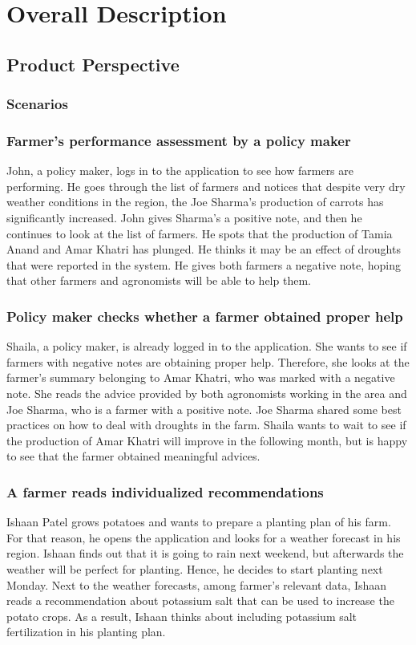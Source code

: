 \chapter{Overall Description}

\section{Product Perspective}
\subsection{Scenarios}
\subsection*{Farmer's performance assessment by a policy maker}
John, a policy maker, logs in to the application to see how farmers are performing. He goes through the list of farmers and notices that despite very dry weather conditions in the region, the Joe Sharma's production of carrots has significantly increased. John gives Sharma's a positive note, and then he continues to look at the list of farmers. He spots that the production of Tamia Anand and Amar Khatri has plunged. He thinks it may be an effect of droughts that were reported in the system. He gives both farmers a negative note, hoping that other farmers and agronomists will be able to help them. 

\subsection*{Policy maker checks whether a farmer obtained proper help}
Shaila, a policy maker, is already logged in to the application. She wants to see if farmers with negative notes are obtaining proper help. Therefore, she looks at the farmer's summary belonging to Amar Khatri, who was marked with a negative note. She reads the advice provided by both agronomists working in the area and Joe Sharma, who is a farmer with a positive note. Joe Sharma shared some best practices on how to deal with droughts in the farm. Shaila wants to wait to see if the production of Amar Khatri will improve in the following month, but is happy to see that the farmer obtained meaningful advices.

\subsection*{A farmer reads individualized recommendations}
Ishaan Patel grows potatoes and wants to prepare a planting plan of his farm. For that reason, he opens the application and looks for a weather forecast in his region. Ishaan finds out that it is going to rain next weekend, but afterwards the weather will be perfect for planting. Hence, he decides to start planting next Monday. Next to the weather forecasts, among farmer's relevant data, Ishaan reads a recommendation about potassium salt that can be used to increase the potato crops. As a result, Ishaan thinks about including potassium salt fertilization in his planting plan. 

